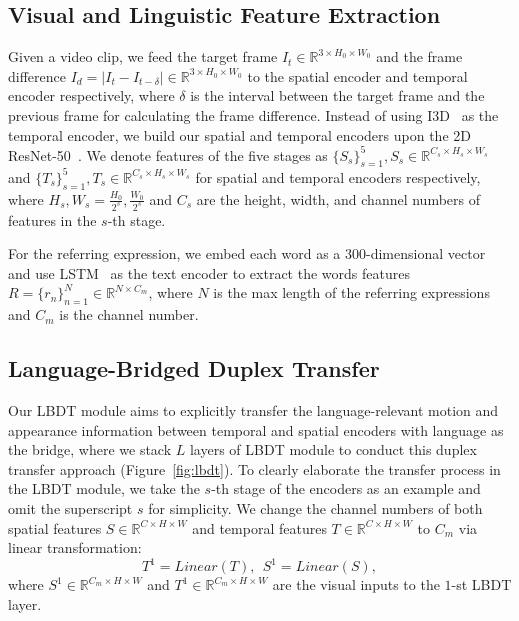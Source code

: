 \documentclass[10pt,twocolumn,letterpaper]{article}
\begin{document}
\subsection{Visual and Linguistic Feature Extraction}
\label{sec:method:enc}

Given a video clip, we feed the target frame $I_t\in \mathbb{R}^{3\times H_0\times W_0}$ and the frame difference $I_d=|I_t-I_{t-\delta}|\in \mathbb{R}^{3\times H_0\times W_0}$ to the spatial encoder and temporal encoder respectively, where $\delta$ is the interval between the target frame and the previous frame for calculating the frame difference. Instead of using I3D~\cite{CarreiraZ17} as the temporal encoder, we build our spatial and temporal encoders upon the 2D ResNet-50~\cite{He2016CVPR}. We denote features of the five stages as $\{S_s\}_{s=1}^5, S_s\in \mathbb{R}^{C_s\times H_s\times W_s}$ and $\{T_s\}_{s=1}^5, T_s\in \mathbb{R}^{C_s\times H_s\times W_s}$ for spatial and temporal encoders respectively, where $H_s, W_s=\frac{H_0}{2^s},\frac{W_0}{2^s}$ and $C_s$ are the height, width, and channel numbers of features in the $s$-th stage.

For the referring expression, we embed each word as a $300$-dimensional vector~\cite{pennington2014glove} and use LSTM~\cite{hochreiter1997long} as the text encoder to extract the words features $R=\{r_n\}_{n=1}^N\in \mathbb{R}^{N\times C_m}$, where $N$ is the max length of the referring expressions and $C_m$ is the channel number.


\subsection{Language-Bridged Duplex Transfer}
\label{sec:method:lmdtm}

Our LBDT module aims to explicitly transfer the language-relevant motion and appearance information between temporal and spatial encoders with language as the bridge, where we stack $L$ layers of LBDT module to conduct this duplex transfer approach (Figure~\ref{fig:lbdt}).
To clearly elaborate the transfer process in the LBDT module, we take the $s$-th stage of the encoders as an example and omit the superscript $s$ for simplicity. We change the channel numbers of both spatial features $S\in \mathbb{R}^{C\times H\times W}$ and temporal features $T\in \mathbb{R}^{C\times H\times W}$ to $C_m$ via linear transformation:
\begin{equation}
    T^1=\textit{Linear}(T),~~S^1=\textit{Linear}(S),
\end{equation}
where $S^1\in \mathbb{R}^{C_m\times H\times W}$ and $T^1\in \mathbb{R}^{C_m\times H\times W}$ are the visual inputs to the $1$-st LBDT layer.
\end{document}
